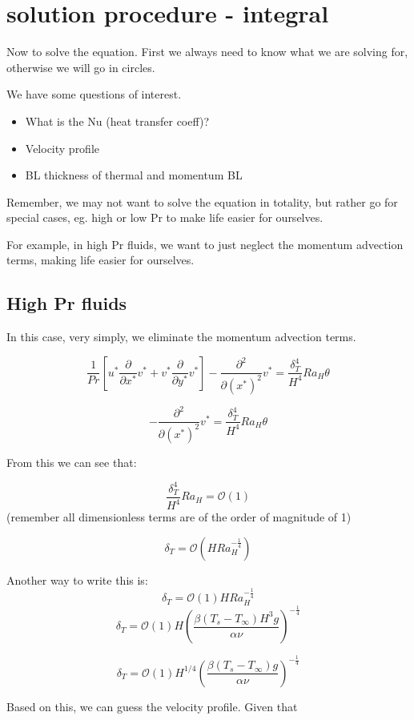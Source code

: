 \documentclass[11pt]{article}
\begin{document}
\section{solution procedure - integral}

Now to solve the equation. First we always need to know what we are solving for, otherwise we will go in circles.

We have some questions of interest.

\begin{itemize}
\item What is the Nu (heat transfer coeff)?
\item Velocity profile
\item BL thickness of thermal and momentum BL
\end{itemize}

Remember, we may not want to solve the equation in totality, but rather go for special cases, eg. high or low Pr to make life easier for ourselves.

For example, in high Pr fluids, we want to just neglect the momentum advection terms, making life easier for ourselves. 

\subsection{High Pr fluids}

In this case, very simply, we eliminate the momentum advection terms.

$$ \frac{1}{Pr} \left[ u^* \frac{\partial}{\partial x^*} v^* +    v^* \frac{\partial}{\partial y^*} v^* \right] -   \frac{\partial^2}{\partial (x^*)^2} v^*  = \frac{\delta_T^4}{ H^4} Ra_H \theta $$

$$  -   \frac{\partial^2}{\partial (x^*)^2} v^*  = \frac{\delta_T^4}{ H^4} Ra_H \theta $$

From this we can see that:

$$ \frac{\delta_T^4}{ H^4} Ra_H =\mathcal{O}(1)$$
(remember all dimensionless terms are of the order of magnitude of 1)

$$\delta_T = \mathcal{O} (H Ra_H^{-\frac{1}{4}})$$

Another way to write this is:
$$\delta_T = \mathcal{O}(1) H Ra_H^{-\frac{1}{4}}$$
$$\delta_T = \mathcal{O}(1) H (\frac{\beta(T_s-T_\infty) H^3 g}{\alpha \nu})^{-\frac{1}{4}}$$

$$\delta_T = \mathcal{O}(1) H^{1/4} (\frac{\beta(T_s-T_\infty) g}{\alpha \nu})^{-\frac{1}{4}}$$


Based on this, we can guess the velocity profile. Given that
\end{document}

